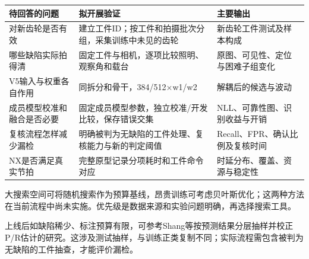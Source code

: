 \par\medskip\noindent\begin{minipage}{\linewidth}\small{}
\begin{tabular}{@{}>{\raggedright\arraybackslash}p{0.240\dimexpr\linewidth-4\tabcolsep\relax}>{\raggedright\arraybackslash}p{0.340\dimexpr\linewidth-4\tabcolsep\relax}>{\raggedright\arraybackslash}p{0.420\dimexpr\linewidth-4\tabcolsep\relax}@{}}
\toprule
待回答的问题 & 拟开展验证 & 主要输出 \\
\midrule
对新齿轮是否有效 & 建立工件ID；按工件和拍摄批次分组，采集训练中未见的齿轮 & 新齿轮工件测试及样本构成 \\
哪些缺陷实际拍得清 & 固定工件与相机，逐项比较照明、观察角和载台 & 原图、可见性、定位与困难子组变化 \\
V5输入与权重各自作用 & 同拆分和骨干，384/512\ensuremath{\times}w1/w2 & 解耦后的候选与波动 \\
成员模型校准和融合是否必要 & 固定成员模型参数，独立校准/开发比较，保存错误交集 & NLL、可靠性图、识别收益与开销 \\
复核流程怎样减少漏检 & 明确被判为无缺陷的工件处理、复核能力与新的判定阈值 & Recall、FPR、确认比例及复核时间 \\
NX是否满足真实节拍 & 完整原型记录分项耗时和工件命令对应 & 时延分布、覆盖、资源与稳定性 \\
\bottomrule\end{tabular}\end{minipage}\par\medskip

大搜索空间可将随机搜索作为预算基线\cite{ref7}，昂贵训练可考虑贝叶斯优化\cite{ref8}；这两种方法在当前流程中尚未实施。优先级是数据来源和实验问题明确，再选择搜索工具。

上线后如缺陷稀少、标注预算有限，可参考Shang等按预测结果分层抽样并校正P/R估计的研究\cite{ref9}。这涉及测试抽样，与训练正类复制不同；实际流程需包含被判为无缺陷的工件抽查，才能评价漏检。

